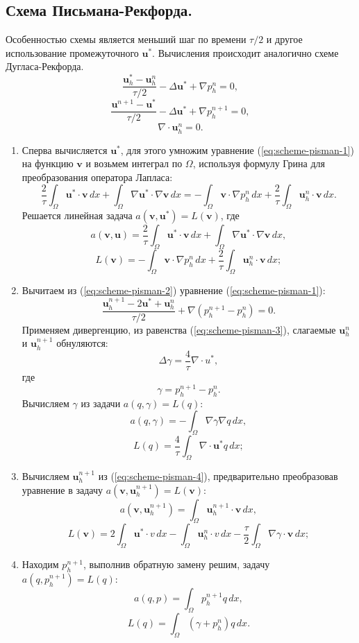 \documentclass[12pt]{article}
\begin{document}
\subsection{Схема Письмана-Рекфорда.} Особенностью схемы является меньший шаг по времени $\tau/2$ и другое использование промежуточного ${\bm u}^*$. Вычисления происходит аналогично схеме Дугласа-Рекфорда.
\begin{equation} \label{eq:scheme-pisman-1}
\frac{{\bm u}_h^{*}-{\bm u}_h^n}{\tau/2} - \Delta {\bm u}^{*}+\nabla p_h^n=0,
\end{equation}
\begin{equation} \label{eq:scheme-pisman-2}
\frac{{\bm u}^{n+1}-{\bm u}^{*}}{\tau/2} - \Delta {\bm u}^{*}+\nabla p_h^{n+1}=0,
\end{equation}
\begin{equation} \label{eq:scheme-pisman-3}
\nabla \cdot {\bm u}_h^n = 0.
\end{equation}
\begin{enumerate}
\item 
Сперва вычисляется ${\bm u}^*$, для этого умножим уравнение (\ref{eq:scheme-pisman-1}) на функцию $\bm v$ и возьмем интеграл по $\Omega$, используя формулу Грина для преобразования оператора Лапласа:
$$
\frac{2}{\tau}\int_{\Omega} {\bm u}^*\cdot {\bm v} \,dx + \int_{\Omega} \nabla {\bm u}^* \cdot \nabla {\bm v} \,dx = -\int_{\Omega} {\bm v} \cdot \nabla p_h^{n}\, dx + \frac{2}{\tau} \int_{\Omega} {\bm u}_h^{n} \cdot {\bm v} \,dx.
$$
Решается линейная задача $a({\bm v}, {\bm u}^*) = L({\bm v})$, где
$$
a({\bm v}, {\bm u}) = \frac{2}{\tau}\int_{\Omega} {\bm u}^*\cdot {\bm v} \,dx + \int_{\Omega} \nabla {\bm u}^* \cdot \nabla {\bm v} \,dx,
$$
$$
L({\bm v}) = -\int_{\Omega} {\bm v} \cdot \nabla p_h^{n} \,dx + \frac{2}{\tau} \int_{\Omega} {\bm u}_h^{n} \cdot {\bm v} \,dx;
$$
\item 
Вычитаем из (\ref{eq:scheme-pisman-2}) уравнение (\ref{eq:scheme-pisman-1}):
\begin{equation} \label{eq:scheme-pisman-4}
\frac{{\bm u}_h^{n+1}-2{\bm u}^* + {\bm u}_h^{n}}{\tau / 2} + {\nabla}(p_h^{n+1} - p_h^n )=0.
\end{equation}
Применяем дивергенцию, из равенства ({\ref{eq:scheme-pisman-3}}), слагаемые ${\bm u}_h^n$ и ${\bm u}_h^{n+1}$  обнуляются:
$$
\Delta \gamma = \frac{4}{\tau} \nabla \cdot u^{*},
$$
где 
$$
\gamma = p_h^{n+1}-p_h^n.
$$
Вычисляем $\gamma$ из задачи $a(q,\gamma)=L(q)$:
$$
a(q, \gamma) = -\int_{\Omega} \nabla \gamma \nabla q \,dx,
$$
$$
L(q) = \frac{4}{\tau} \int_{\Omega} \nabla \cdot {\bm u}^* q \,dx;
$$
\item 
Вычисляем ${\bm u}_h^{n+1}$ из (\ref{eq:scheme-pisman-4}), предварительно преобразовав уравнение в задачу $a({\bm v}, {\bm u}_h^{n+1}) = L({\bm v})$:
$$
a({\bm v}, {\bm u}_h^{n+1}) = \int_{\Omega} {\bm u}_h^{n+1} \cdot {\bm v}\,dx,
$$
$$
L({\bm v}) = 2 \int_{\Omega} {\bm u}^* \cdot v \,dx - \int_{\Omega} {\bm u}_h^n \cdot v \,dx - \frac{\tau}{2} \int_{\Omega} \nabla \gamma \cdot {\bm v} \,dx;
$$
\item 
Находим $p_h^{n+1}$, выполнив обратную замену решим, задачу $a(q,p_h^{n+1})=L(q)$:
$$
a(q, p) = \int_{\Omega} p_h^{n+1} q\,dx,
$$
$$
L(q) = \int_{\Omega} (\gamma + p_h^n) q\,dx.
$$
\end{enumerate}
\end{document}
